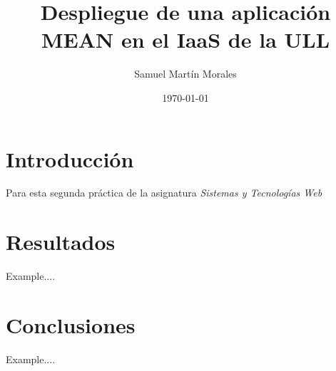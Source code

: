 \documentclass{report}
\begin{document}
	
	
	\title{Despliegue de una aplicación MEAN en el IaaS de la ULL}
	\author{Samuel Martín Morales}
	\date{\today}
	
	\maketitle
	
	\tableofcontents
	
	\chapter{Introducción}
  Para esta segunda práctica de la asignatura \emph{Sistemas y Tecnologías Web}
	
	\chapter{Resultados}
	Example....
	
	
	\chapter{Conclusiones}
  Example....	
	
\end{document}
